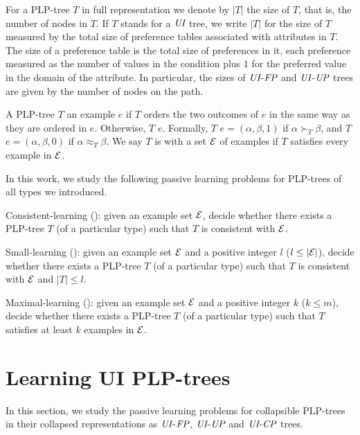 For a PLP-tree $T$ in full representation we denote by $|T|$ the size of $T$, 
that is, the number of nodes in $T$. If $T$ stands for a $\textit{UI}$ tree, we write $|T|$ for
the size of $T$ measured by the total size of preference tables associated
with attributes in $T$. The size of a preference table is the total size of
preferences in it, each preference measured as the number of values in the condition
plus $1$ for the preferred value in the domain of the attribute.
In particular, the sizes of $\textit{UI}$-$\textit{FP}$ and $\textit{UI}$-$\textit{UP}$ trees are
given by the number of nodes on the path. 

A PLP-tree $T$  an example $e$ if $T$ orders the two 
outcomes of $e$ in the same way as they are ordered in $e$. Otherwise,
$T$  $e$. Formally, $T$  $e=(\alpha,\beta,1)$
if $\alpha \succ_T \beta$, and $T$  $e=(\alpha,\beta,0)$ if
$\alpha \approx_T \beta$. We say $T$ is  with a set $\mathcal{E}$ 
of examples if $T$ satisfies every example in $\mathcal{E}$.

In this work, we study the following passive learning problems for PLP-trees 
of all types we introduced.
\begin{definition}
Consistent-learning (): given an example set $\mathcal{E}$, decide 
whether there exists a PLP-tree $T$ (of a particular type) such that $T$ 
is consistent with $\mathcal{E}$.
\end{definition}

\begin{definition}
Small-learning (): given an example set $\mathcal{E}$
and a positive integer $l$ ($l \leq |\mathcal{E}|$), decide whether there 
exists a PLP-tree $T$ (of a particular type) such that $T$ is consistent 
with $\mathcal{E}$ and $|T| \leq l$.
\end{definition}

\begin{definition}
Maximal-learning (): given an example set $\mathcal{E}$ and a 
positive integer $k$ ($k \leq m$), decide whether there exists a PLP-tree 
$T$ (of a particular type) such that $T$ satisfies at least $k$ examples 
in $\mathcal{E}$.
\end{definition}


\section{Learning UI PLP-trees}
In this section, we study the passive learning problems for collapsible 
PLP-trees in their collapsed representations as $\textit{UI}$-$\textit{FP}$, $\textit{UI}$-$\textit{UP}$ and
$\textit{UI}$-$\textit{CP}$ trees.


